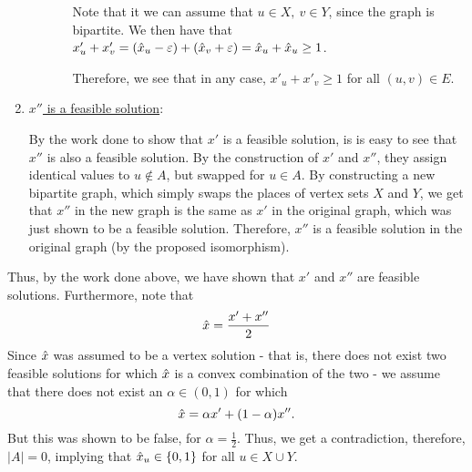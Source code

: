 \begin{solution}
\begin{enumerate}
\begin{enumerate}
\begin{enumerate}
                 \hop
                 Note that it we can assume that $u \in X,  \ v \in Y$, since the graph is bipartite. We then have that $x'_u + x'_v = (\hat{x}_u - \varepsilon) + (\hat{x}_v + \varepsilon) = \hat{x}_u + \hat{x}_u \geq 1$. 

                 \jump
                 Therefore, we see that in any case, $x'_u + x'_v \geq 1$ for all $(u, v) \in E$.
            \end{enumerate}
        \end{enumerate}

        \item \underline{$x''$ is a feasible solution}:

        \hop
        By the work done to show that $x'$ is a feasible solution, is is easy to see that $x''$ is also a feasible solution. By the construction of $x'$ and $x''$, they assign identical values to $u \not \in A$, but swapped for $u \in A$. By constructing a new bipartite graph, which simply swaps the places of vertex sets $X$ and $Y$, we get that $x''$ in the new graph is the same as $x'$ in the original graph, which was just shown to be a feasible solution. Therefore, $x''$ is a feasible solution in the original graph (by the proposed isomorphism).  
    \end{enumerate}

    \newpage
    Thus, by the work done above, we have shown that $x'$ and $x''$ are feasible solutions. Furthermore, note that 
    \[\hat{x} = \frac{x' + x''}{2}\]
    Since $\hat{x}$ was assumed to be a vertex solution - that is, there does not exist two feasible solutions for which $\hat{x}$ is a convex combination of the two - we assume that there does not exist an $\alpha \in (0, 1)$ for which
    \[\hat{x} = \alpha x' + (1 - \alpha) x''.\]
    But this was shown to be false, for $\alpha = \frac{1}{2}$. Thus, we get a contradiction, therefore, $|A| = 0$, implying that $\hat{x}_u \in \{0, 1\}$ for all $u \in X\cup Y$.
\end{solution}
\newpage
